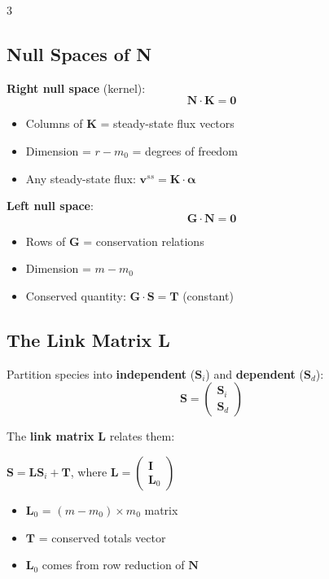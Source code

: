 \documentclass[10pt,landscape,letter]{article}
\begin{document}
\begin{multicols}{3}
\subsection{Null Spaces of N}

\textbf{Right null space} (kernel):
\begin{equation*}
\mathbf{N} \cdot \mathbf{K} = \mathbf{0}
\end{equation*}
\begin{itemize}
\item Columns of $\mathbf{K}$ = steady-state flux vectors
\item Dimension = $r - m_0$ = degrees of freedom
\item Any steady-state flux: $\mathbf{v}^{ss} = \mathbf{K} \cdot \boldsymbol{\alpha}$
\end{itemize}

\textbf{Left null space}:
\begin{equation*}
\mathbf{G} \cdot \mathbf{N} = \mathbf{0}
\end{equation*}
\begin{itemize}
\item Rows of $\mathbf{G}$ = conservation relations
\item Dimension = $m - m_0$
\item Conserved quantity: $\mathbf{G} \cdot \mathbf{S} = \mathbf{T}$ (constant)
\end{itemize}

\subsection{The Link Matrix L}

Partition species into \textbf{independent} ($\mathbf{S}_i$) and \textbf{dependent} ($\mathbf{S}_d$):
\begin{equation*}
\mathbf{S} = \begin{pmatrix} \mathbf{S}_i \\ \mathbf{S}_d \end{pmatrix}
\end{equation*}

The \textbf{link matrix} $\mathbf{L}$ relates them:

$\mathbf{S} = \mathbf{L} \mathbf{S}_i + \mathbf{T}$, where
$\mathbf{L} = \begin{pmatrix} \mathbf{I} \\ \mathbf{L}_0 \end{pmatrix}$

\begin{itemize}
\item $\mathbf{L}_0$ = $(m-m_0) \times m_0$ matrix
\item $\mathbf{T}$ = conserved totals vector
\item $\mathbf{L}_0$ comes from row reduction of $\mathbf{N}$
\end{itemize}


\end{multicols}
\end{document}
